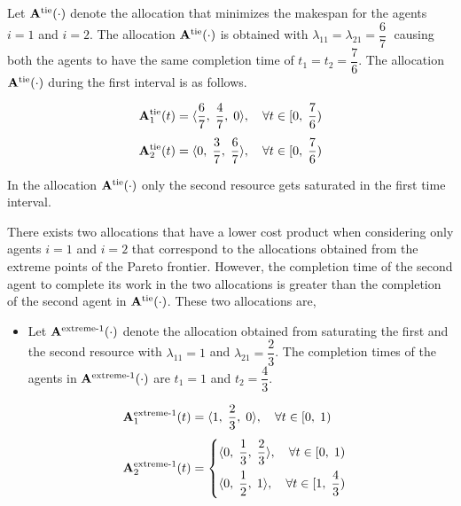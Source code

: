 \documentclass[letterpaper]{article} %
\theoremstyle{definition}
\newenvironment{customexample}[1]
  {\renewcommand\theinnercustomexample{#1}\innercustomexample}
  {\endinnercustomexample}
\begin{document}
\begin{customexample}{1}
Let $\mathbf{A}^{\textnormal{tie}}(\cdot)$ denote the allocation that minimizes the makespan for the agents $i = 1$ and  $i = 2$. The allocation $\mathbf{A}^{\textnormal{tie}}(\cdot)$ is obtained with $\lambda_{11} = \lambda_{21} = \dfrac{6}{7} \;$ causing both the agents to have the same completion time of $t_{1} = t_{2} = \dfrac{7}{6}$. The allocation $\mathbf{A}^{\textnormal{tie}}(\cdot)$ during the first interval is as follows.
\begin{linenomath}
\begin{equation*}
\begin{split}
\mathbf{A}^{\textnormal{tie}}_{1}(t) = \langle \dfrac{6}{7}, \; \dfrac{4}{7}, \;  0 \rangle, \quad \forall t \in [0, \; \dfrac{7}{6}) \\[4 pt]
\mathbf{A}^{\textnormal{tie}}_{2}(t) = \langle 0, \; \dfrac{3}{7}, \;  \dfrac{6}{7} \rangle, \quad \forall t \in [0, \; \dfrac{7}{6})
\end{split}    
\end{equation*}
\end{linenomath}

\noindent In the allocation $\mathbf{A}^{\textnormal{tie}}(\cdot)$ only the second resource gets saturated in the first time interval.

There exists two allocations that have a lower cost product when considering only agents $i = 1$ and $i = 2$ that correspond to the allocations obtained from the extreme points of the Pareto frontier. However, the completion time of the second agent to complete its work in the two allocations is greater than the completion of the second agent in $\mathbf{A}^{\textnormal{tie}}(\cdot)$. These two allocations are,
\begin{itemize}
    \item Let $\mathbf{A}^{\textnormal{extreme-1}}(\cdot)$ denote the allocation obtained from saturating the first and the second resource with $\lambda_{11} = 1$ and $\lambda_{21} = \dfrac{2}{3}$. The completion times of the agents in $\mathbf{A}^{\textnormal{extreme-1}}(\cdot)$ are $t_{1} = 1$ and $t_{2} = \dfrac{4}{3}$.\\
    \begin{linenomath}
    \begin{equation*}
    \begin{split}
    \mathbf{A}^{\textnormal{extreme-1}}_{1}(t) & = \langle 1, \; \dfrac{2}{3}, \;  0 \rangle, \quad \forall t \in [0, \; 1)\\[4 pt] 
    \mathbf{A}^{\textnormal{extreme-1}}_{2}(t) & = \begin{cases} \langle 0, \; \dfrac{1}{3}, \; \dfrac{2}{3} \rangle, \quad \forall t \in [0, \; 1)\\[8 pt] \langle 0, \; \dfrac{1}{2}, \; 1\rangle, \quad \forall t \in [1, \; \dfrac{4}{3})\\[4 pt] \end{cases}\\   
    \end{split}    
    \end{equation*}
    \end{linenomath}
    

\end{itemize}
\end{customexample}
\end{document}

